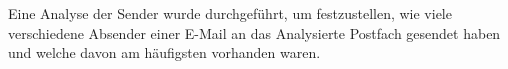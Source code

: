 Eine Analyse der Sender wurde durchgeführt, um festzustellen, wie viele verschiedene Absender einer E-Mail an das Analysierte Postfach gesendet haben und welche davon am häufigsten vorhanden waren.

